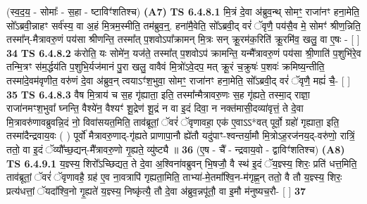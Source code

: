 \documentclass[17pt]{extarticle}
\begin{document}
                  \newline
                      (स्व॒द॒य॒ - सोमाः᳚ - स॒हा - ष्टाविꣳ॑शतिश्च)  \textbf{(A7)} \newline \newline
                                        \textbf{ TS 6.4.8.1} \newline
                  मि॒त्रं दे॒वा अ॑ब्रुव॒न्थ् सोमꣳ॒॒ राजा॑नꣳ हना॒मेति॒ सो᳚ऽब्रवी॒न्नाहꣳ सर्व॑स्य॒ वा अ॒हं मि॒त्रम॒स्मीति॒ तम॑ब्रुव॒न्॒. हना॑मै॒वेति॒ सो᳚ऽब्रवी॒द् वरं॑ ॅवृणै॒ पय॑सै॒व मे॒ सोमꣳ॑ श्रीण॒न्निति॒ तस्मा᳚न्-मैत्रावरु॒णं पय॑सा श्रीणन्ति॒ तस्मा᳚त् प॒शवोऽपा᳚क्रामन् मि॒त्रः सन् क्रू॒रम॑क॒रिति॑ क्रू॒रमि॑व॒ खलु॒ वा ए॒षः - [  ] \textbf{  34} \newline
                  \newline
                                \textbf{ TS 6.4.8.2} \newline
                  क॑रोति॒ यः सोमे॑न॒ यज॑ते॒ तस्मा᳚त् प॒शवोऽप॑ क्रामन्ति॒ यन्मै᳚त्रावरु॒णं पय॑सा श्री॒णाति॑ प॒शुभि॑रे॒व तन्मि॒त्रꣳ स॑म॒र्द्धय॑ति प॒शुभि॒र्यज॑मानं पु॒रा खलु॒ वावैवं मि॒त्रो॑ऽवे॒दप॒ मत् क्रू॒रं च॒क्रुषः॑ प॒शवः॑ क्रमिष्य॒न्तीति॒ तस्मा॑दे॒वम॑वृणीत॒ वरु॑णं दे॒वा अ॑ब्रुव॒न् त्वयाऽꣳ॑श॒भुवा॒ सोमꣳ॒॒ राजा॑नꣳ हना॒मेति॒ सो᳚ऽब्रवी॒द् वरं॑ ॅवृणै॒ मह्यं॑ चै॒- [  ] \textbf{  35} \newline
                  \newline
                                \textbf{ TS 6.4.8.3} \newline
                  वैष मि॒त्राय॑ च स॒ह गृ॑ह्याता॒ इति॒ तस्मा᳚न्मैत्रावरु॒णः स॒ह गृ॑ह्यते॒ तस्मा॒द् राज्ञा॒ राजा॑नमꣳश॒भुवा᳚ घ्नन्ति॒ वैश्ये॑न॒ वैश्यꣳ॑ शू॒द्रेण॑ शू॒द्रं न वा इ॒दं दिवा॒ न नक्त॑मासी॒दव्या॑वृत्तं॒ ते दे॒वा मि॒त्रावरु॑णावब्रुवन्नि॒दं नो॒ विवा॑सयत॒मिति॒ ताव॑ब्रूतां॒ ॅवरं॑ ॅवृणावहा॒ एक॑ ए॒वाऽऽ*वत् पूर्वो॒ ग्रहो॑ गृह्याता॒ इति॒ तस्मा॑दैन्द्रवाय॒वः ( ) पूर्वो॑ मैत्रावरु॒णाद्-गृ॑ह्यते प्राणापा॒नौ ह्ये॑तौ यदु॑पाꣳ-श्वन्तर्या॒मौ मि॒त्रोऽह॒रज॑नय॒द्-वरु॑णो॒ रात्रिं॒ ततो॒ वा इ॒दं ॅव्यौ᳚च्छ॒द्यन्-मै᳚त्रावरु॒णो गृ॒ह्यते॒ व्यु॑ष्ट्यै ॥ \textbf{  36 } \newline
                  \newline
                      (ए॒ष - चै᳚ - न्द्रवाय॒वो - द्वाविꣳ॑शतिश्च)  \textbf{(A8)} \newline \newline
                                        \textbf{ TS 6.4.9.1} \newline
                  य॒ज्ञ्स्य॒ शिरो᳚ऽच्छिद्यत॒ ते दे॒वा अ॒श्विना॑वब्रुवन् भि॒षजौ॒ वै स्थ॑ इ॒दं ॅय॒ज्ञ्स्य॒ शिरः॒ प्रति॑ धत्त॒मिति॒ ताव॑ब्रूतां॒ ॅवरं॑ ॅवृणावहै॒ ग्रह॑ ए॒व ना॒वत्रापि॑ गृह्यता॒मिति॒ ताभ्या॑-मे॒तमा᳚श्वि॒न-म॑गृह्ण॒न् ततो॒ वै तौ य॒ज्ञ्स्य॒ शिरः॒ प्रत्य॑धत्तां॒ ॅयदा᳚श्वि॒नो गृ॒ह्यते॑ य॒ज्ञ्स्य॒ निष्कृ॑त्यै॒ तौ दे॒वा अ॑ब्रुव॒न्नपू॑तौ॒ वा इ॒मौ म॑नुष्यच॒रौ- [  ] \textbf{  37} \newline
\end{document}
